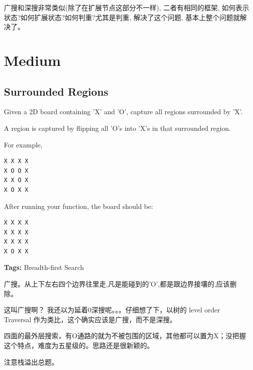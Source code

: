 \documentclass[12pt]{book}
\begin{document}
广搜和深搜非常类似(除了在扩展节点这部分不一样), 二者有相同的框架, 如何表示状态?如何扩展状态?如何判重?尤其是判重, 解决了这个问题, 基本上整个问题就解决了。
\section{Medium}
\label{sec-10-1}
\subsection{Surrounded Regions}
\label{sec-10-1-1}
Given a 2D board containing 'X' and 'O', capture all regions surrounded by 'X'.

A region is captured by flipping all 'O's into 'X's in that surrounded region.

For example,
\lstset{language=java,label= ,caption= ,numbers=none}
\begin{lstlisting}
X X X X
X O O X
X X O X
X O X X
\end{lstlisting}

After running your function, the board should be:
\lstset{language=java,label= ,caption= ,numbers=none}
\begin{lstlisting}
X X X X
X X X X
X X X X
X O X X
\end{lstlisting}

\textbf{Tags:} Breadth-first Search

广搜。从上下左右四个边界往里走,凡是能碰到的'O',都是跟边界接壤的,应该删
除。

这叫广搜啊？ 我还以为延着0深搜呢。。。仔细想了下，以树的 level order
Traversal 作为类比，这个确实应该是广搜，而不是深搜。

四面的最外层搜索，有O通路的就为不被包围的区域，其他都可以置为X；没把握
这个特点，难度为五星级的。思路还是很新颖的。

注意栈溢出总题。
\end{document}
